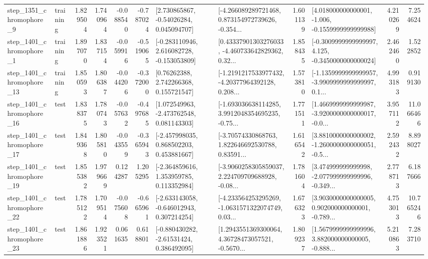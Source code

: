 \begin{tabular}{llrrrrllrlrr}
  step\_1351\_chromophore\_9 &  training &      1.829504 &    1.740964 &     -0.088540 & -0.787024 &     [2.730865867, -0.54026284, 0.045094707] &  [-4.266089289721468, 0.873154972739626, -0.354... &       1.601139 &   [4.018000000000001, -1.006, -0.1559999999999988] &            4.210269 &          7.254624 \\
  step\_1401\_chromophore\_1 &  training &      1.897070 &    1.837154 &     -0.059916 & -0.519065 &   [-0.283110946, 2.616082728, -0.153053809] &  [0.43337901303276033, -4.460733642829362, 0.32... &       1.858435 &  [-0.3009999999999997, 4.125, -0.3450000000000024] &            2.462460 &          1.522852 \\
 step\_1401\_chromophore\_13 &  training &      1.850593 &    1.806387 &     -0.044206 & -0.372000 &      [0.76262388, 2.742266368, 0.155721547] &  [-1.2191217533977432, -4.20377964392128, 0.208... &       1.573810 &  [-1.1359999999999957, -3.9909999999999997, 0.1... &            4.993183 &          0.919130 \\
 step\_1401\_chromophore\_16 &      test &      1.838375 &    1.780743 &     -0.057632 & -0.497685 &    [1.072549963, -2.473762548, 0.081143303] &  [-1.693036638114285, 3.9912048354695235, -0.75... &       1.771511 &  [1.4669999999999987, -3.9200000000000017, -0.0... &            3.957112 &         11.066466 \\
 step\_1401\_chromophore\_17 &      test &      1.849368 &    1.805810 &     -0.043559 & -0.365943 &    [-2.457998035, 0.868502203, 0.453881667] &  [-3.70574330868763, 1.822646692530788, 0.83591... &       1.616542 &  [3.8810000000000002, -1.2600000000000051, -0.5... &            2.592432 &          8.898027 \\
 step\_1401\_chromophore\_19 &      test &      1.855382 &    1.979669 &      0.124287 &  1.205295 &    [-2.364859616, 1.353959785, 0.113352984] &  [-3.9060258305859037, 2.224709709688928, -0.08... &       1.781604 &  [3.474999999999998, -2.077999999999996, -0.349... &            2.778713 &          6.187666 \\
 step\_1401\_chromophore\_22 &      test &      1.785122 &    1.709514 &     -0.075608 & -0.665961 &   [-2.633143058, -0.646012943, 0.307214254] &  [-4.233564253295269, -1.0631571322074749, 0.03... &       1.676323 &  [3.9030000000000005, 0.902000000000001, -0.789... &            4.753013 &         10.765246 \\
 step\_1401\_chromophore\_23 &      test &      1.861886 &    1.923521 &      0.061635 &  0.618801 &    [-0.880430282, -2.61531424, 0.386492095] &  [1.2943551369300064, 4.36728473057521, -0.5670... &       1.809237 &  [1.5679999999999996, 3.882000000000005, -0.888... &            5.210863 &          7.283710 \\

\end{tabular}

